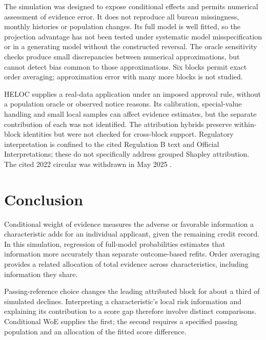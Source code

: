 The simulation was designed to expose conditional effects and permits numerical assessment of evidence error. It does not reproduce all bureau missingness, monthly histories or population changes. Its full model is well fitted, so the projection advantage has not been tested under systematic model misspecification or in a generating model without the constructed reversal. The oracle sensitivity checks produce small discrepancies between numerical approximations, but cannot detect bias common to those approximations. Six blocks permit exact order averaging; approximation error with many more blocks is not studied.

HELOC supplies a real-data application under an imposed approval rule, without a population oracle or observed notice reasons. Its calibration, special-value handling and small local samples can affect evidence estimates, but the separate contribution of each was not identified. The attribution hybrids preserve within-block identities but were not checked for cross-block support. Regulatory interpretation is confined to the cited Regulation B text and Official Interpretations; these do not specifically address grouped Shapley attribution. The cited 2022 circular was withdrawn in May 2025 \citep{withdrawn}.

\section{Conclusion}

Conditional weight of evidence measures the adverse or favorable information a characteristic adds for an individual applicant, given the remaining credit record. In this simulation, regression of full-model probabilities estimates that information more accurately than separate outcome-based refits. Order averaging provides a related allocation of total evidence across characteristics, including information they share.

Passing-reference choice changes the leading attributed block for about a third of simulated declines. Interpreting a characteristic's local risk information and explaining its contribution to a score gap therefore involve distinct comparisons. Conditional WoE supplies the first; the second requires a specified passing population and an allocation of the fitted score difference.
